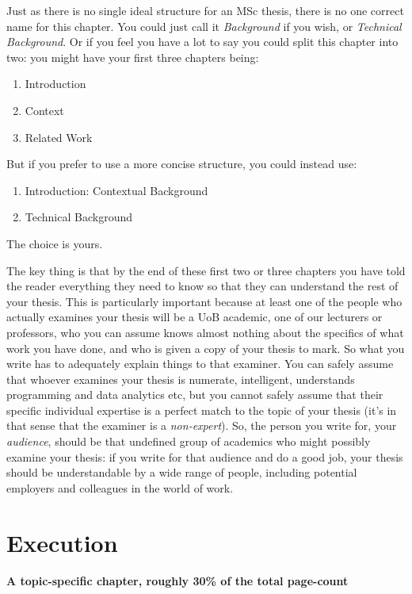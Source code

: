\documentclass[ %
                    author={Carlos Duran Calle},
                supervisor={Dr. Felipe Campelo},
                    degree={MSc},
                     title={Comparative Machine Learning Analysis for Student Dropout Prediction in a Virtual Learning Environment},
                  subtitle={Incorporating Student Engagement and Socio-Economic Features},
                      type={},
                      year={2025}]{dissertation}
\begin{document}
Just as there is no single ideal structure for an MSc thesis, there is no one correct name for this chapter. You could just call it {\em Background}\/ if you wish, or {\em Technical Background}. Or if you feel you have a lot to say you could split this chapter into two: you might have your first three chapters being:
\begin{enumerate}
\item Introduction
\item Context
\item Related Work
\end{enumerate}
\noindent
But if you prefer to use a more concise structure, you could instead use:
\begin{enumerate}
\item Introduction: Contextual Background
\item Technical Background
\end{enumerate}
\noindent
The choice is yours. 


The key thing is that by the end of these first two or three chapters you have told the reader everything they need to know so that they can understand the rest of your thesis. This is particularly important because at least one of the people who actually examines your thesis will be a UoB academic, one of our lecturers or professors, who you can assume knows almost nothing about the specifics of what work you have done, and who is given a copy of your thesis to mark. So what you write has to adequately explain things to that examiner. You can safely assume that whoever examines your thesis is numerate, intelligent, understands programming and data analytics etc, but you cannot safely assume that their specific individual expertise is a perfect match to the topic of your thesis (it's in that sense that the examiner is a {\em non-expert}). So, the person you write for, your {\em audience}, should be that undefined group of academics who might possibly examine your thesis: if you write for that audience and do a good job, your thesis should be understandable by a wide range of people, including potential employers and colleagues in the world of work.


\chapter{Execution}
\label{chap:execution}

{\bf A topic-specific chapter, roughly 30\% of the total page-count}
\vspace{1cm} 
\end{document}
